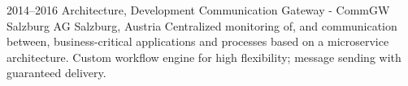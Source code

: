 \cventry
{2014--2016}
{Architecture, Development}
{Communication Gateway - CommGW}
{Salzburg AG}
{Salzburg, Austria}
{
  Centralized monitoring of, and communication between, business-critical
  applications and processes based on a microservice architecture.
  Custom workflow engine for high flexibility; message sending
  with guaranteed delivery.
}
